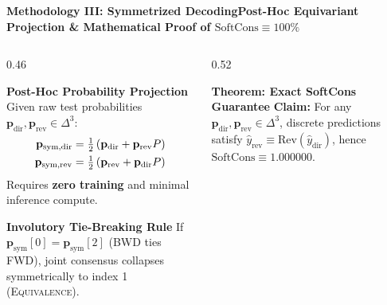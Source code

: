 \documentclass[aspectratio=169,10pt]{beamer}
\begin{document}
\begin{frame}{\textbf{Methodology III: Symmetrized Decoding}}{\textbf{Post-Hoc Equivariant Projection \& Mathematical Proof of $\text{SoftCons} \equiv 100\%$}}
  \begin{columns}[T]
    \begin{column}{0.46\textwidth}
      \begin{block}{\textbf{Post-Hoc Probability Projection}}
        \footnotesize
        Given raw test probabilities $\mathbf{p}_{\text{dir}}, \mathbf{p}_{\text{rev}} \in \Delta^3$:
        \vspace{-3pt}
        \begin{align*}
          \setlength{\jot}{0pt}
          \mathbf{p}_{\text{sym,dir}} &= \tfrac{1}{2}\left(\mathbf{p}_{\text{dir}} + \mathbf{p}_{\text{rev}} P\right) \\
          \mathbf{p}_{\text{sym,rev}} &= \tfrac{1}{2}\left(\mathbf{p}_{\text{rev}} + \mathbf{p}_{\text{dir}} P\right)
        \end{align*}
        \vspace{-5pt}
        Requires \textbf{zero training} and minimal inference compute.
      \end{block}
      \vspace{0.05cm}
      \begin{block}{\textbf{Involutory Tie-Breaking Rule}}
        \footnotesize
        If $\mathbf{p}_{\text{sym}}[0] = \mathbf{p}_{\text{sym}}[2]$ (BWD ties FWD), joint consensus collapses symmetrically to index 1 (\textsc{Equivalence}).
      \end{block}
    \end{column}

    \begin{column}{0.52\textwidth}
      \begin{exampleblock}{\textbf{Theorem: Exact SoftCons Guarantee}}
        \footnotesize
        \textbf{Claim:} For any $\mathbf{p}_{\text{dir}}, \mathbf{p}_{\text{rev}} \in \Delta^3$, discrete predictions satisfy $\hat{y}_{\text{rev}} \equiv \text{Rev}(\hat{y}_{\text{dir}})$, hence $\text{SoftCons} \equiv 1.000000$.


\end{exampleblock}
\end{column}
\end{columns}
\end{frame}
\end{document}
